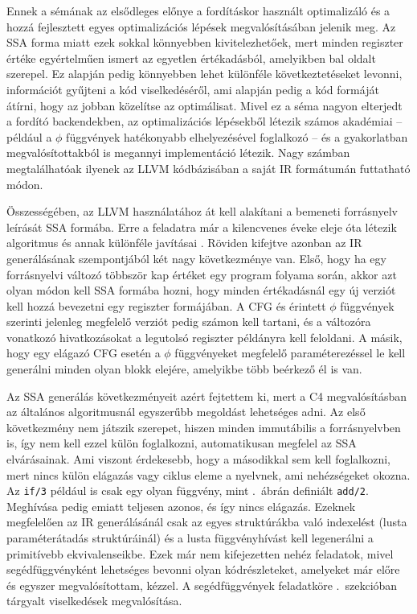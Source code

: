 Ennek a sémának az elsődleges előnye a fordításkor használt optimalizáló és a hozzá fejlesztett egyes optimalizációs lépések megvalósításában jelenik meg.
Az \gls{SSA} forma miatt ezek sokkal könnyebben kivitelezhetőek, mert minden regiszter értéke egyértelműen ismert az egyetlen értékadásból, amelyikben bal oldalt szerepel.
Ez alapján pedig könnyebben lehet különféle következtetéseket levonni, információt gyűjteni a kód viselkedéséről, ami alapján pedig a kód formáját átírni, hogy az jobban közelítse az optimálisat.
Mivel ez a séma nagyon elterjedt a fordító backendekben, az optimalizációs lépésekből létezik számos akadémiai -- például a $\phi$ függvények hatékonyabb elhelyezésével foglalkozó \cite{boissinotRevisitingOutofSSATranslation2008} -- és a gyakorlatban megvalósítottakból is megannyi implementáció létezik.
Nagy számban megtalálhatóak ilyenek az LLVM kódbázisában a saját \gls{IR} formátumán futtatható módon.

Összességében, az LLVM használatához át kell alakítani a bemeneti forrásnyelv leírását \gls{SSA} formába.
Erre a feladatra már a kilencvenes éveke eleje óta létezik algoritmus \cite{cytronEfficientlyComputingStatic1991} és annak különféle javításai \cite{briggsPracticalImprovementsConstruction1998}.
Röviden kifejtve azonban az \gls{IR} generálásának szempontjából két nagy következménye van.
Első, hogy ha egy forrásnyelvi változó többször kap értéket egy program folyama során, akkor azt olyan módon kell \gls{SSA} formába hozni, hogy minden értékadásnál egy új verziót kell hozzá bevezetni egy regiszter formájában.
A \gls{CFG} és érintett $\phi$ függvények szerinti jelenleg megfelelő verziót pedig számon kell tartani, és a változóra vonatkozó hivatkozásokat a legutolsó regiszter példányra kell feloldani.
A másik, hogy egy elágazó \gls{CFG} esetén a $\phi$ függvényeket megfelelő paraméterezéssel le kell generálni minden olyan blokk elejére, amelyikbe több beérkező él is van.

Az \gls{SSA} generálás következményeit azért fejtettem ki, mert a C4 megvalósításban az általános algoritmusnál egyszerűbb megoldást lehetséges adni.
Az első következmény nem játszik szerepet, hiszen minden immutábilis a forrásnyelvben is, így nem kell ezzel külön foglalkozni, automatikusan megfelel az \gls{SSA} elvárásainak.
Ami viszont érdekesebb, hogy a másodikkal sem kell foglalkozni, mert nincs külön elágazás vagy ciklus eleme a nyelvnek, ami nehézségeket okozna.
Az {\tt if/3} például is csak egy olyan függvény, mint .~ábrán definiált {\tt add/2}.
Meghívása pedig emiatt teljesen azonos, és így nincs elágazás.
Ezeknek megfelelően az \gls{IR} generálásánál csak az egyes struktúrákba való indexelést (lusta paraméterátadás struktúráinál) és a lusta függvényhívást kell legenerálni a primitívebb ekvivalenseikbe.
Ezek már nem kifejezetten nehéz feladatok, mivel segédfüggvényként lehetséges bevonni olyan kódrészleteket, amelyeket már előre és egyszer megvalósítottam, kézzel.
A segédfüggvények feladatköre .~szekcióban tárgyalt viselkedések megvalósítása.

